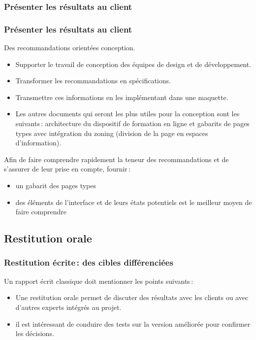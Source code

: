 \subsubsection{Présenter les résultats au client} 
		\begin{frame}[allowframebreaks]
		\frametitle{Présenter les résultats au client \citep{ergolab2014a}}
			Des recommandations orientées conception.
					\begin {itemize}
				      \item Supporter le travail de conception des équipes de design et de développement. 
				      \item Transformer les recommandations en spécifications.
				      \item Transmettre ces informations en les implémentant dans une maquette. 
				       
					\item Les autres documents qui seront les plus utiles pour la conception sont les suivants\,: architecture du dispositif de formation en ligne et gabarits de pages types avec intégration du zoning (division de la page en espaces d'information). 				      		
					\end{itemize}
\pagebreak				 
				 Afin de faire comprendre rapidement la teneur des recommandations et de s'assurer de leur prise en compte, fournir\,:
				      		\begin {itemize}
				     		\item un gabarit des pages types
				     		\item des éléments de l'interface et de leurs états potentiels est le meilleur moyen de faire comprendre
				     		\end{itemize}
		\end{frame}   
		
		 	\subsection{Restitution orale} 
		\begin{frame}[allowframebreaks]
		\frametitle{Restitution écrite\,: des cibles différenciées  \citep{ergolab2014a}}
			Un rapport écrit classique doit mentionner les points suivants\,:
			\begin {itemize}
			\item Une restitution orale permet de discuter des résultats avec les clients ou avec d'autres experts intégrés au projet.
			\item il est intéressant de conduire des tests sur la version améliorée pour confirmer les décisions.
			\end{itemize}
		\end{frame}    	
	 		
